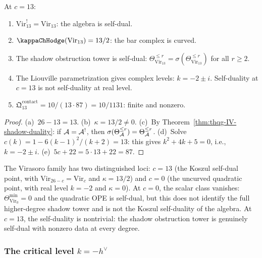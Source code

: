 \begin{proposition}[The $c = 13$ self-dual point; \ClaimStatusProvedHere]
At $c = 13$:
\begin{enumerate}[label=\textup{(\alph*)}]
\item $\mathrm{Vir}_{13}^! = \mathrm{Vir}_{13}$: the algebra is
 self-dual.
\item $\kappaChHodge(\mathrm{Vir}_{13}) = 13/2$: the bar complex is curved.
\item The shadow obstruction tower is self-dual:
 $\Theta_{\mathrm{Vir}_{13}}^{\leq r} = \sigma(\Theta_{\mathrm{Vir}_{13}}^{\leq r})$
 for all $r \geq 2$.
\item The Liouville parametrization gives complex levels:
 $k = -2 \pm i$. Self-duality at $c = 13$ is not
 self-duality at real level.
\item $\mathfrak{Q}^{\mathrm{contact}}_{13} = 10/(13 \cdot 87)
 = 10/1131$: finite and nonzero.
\end{enumerate}
\end{proposition}

\begin{proof}
(a)~$26 - 13 = 13$.
(b)~$\kappa = 13/2 \neq 0$.
(c)~By Theorem~\ref{thm:thqg-IV-shadow-duality}: if $\mathcal{A} = \mathcal{A}^!$,
then $\sigma(\Theta_{\mathcal{A}}^{\leq r}) = \Theta_{\mathcal{A}}^{\leq r}$.
(d)~Solve $c(k) = 1 - 6(k-1)^2/(k+2) = 13$: this gives
$k^2 + 4k + 5 = 0$, i.e., $k = -2 \pm i$.
(e)~$5c + 22 = 5 \cdot 13 + 22 = 87$.
\end{proof}

\begin{remark}[Koszul self-duality at $c = 13$ vs.\ the uncurved quadratic locus at $c = 0$]
The Virasoro family has two distinguished loci:
$c = 13$ (the Koszul self-dual point, with
$\mathrm{Vir}_{26-c} = \mathrm{Vir}_c$ and $\kappa = 13/2$) and
$c = 0$ (the uncurved quadratic point, with real level $k = -2$
and $\kappa = 0$). At $c = 0$, the scalar class vanishes:
$\Theta_{\mathrm{Vir}_0}^{\min} = 0$ and the quadratic OPE is
self-dual, but this does not identify the full higher-degree shadow
tower and is not the Koszul self-duality of the algebra.
At $c = 13$, the self-duality is nontrivial: the shadow obstruction tower is
genuinely self-dual with nonzero data at every degree.
\end{remark}

\subsubsection{The critical level \texorpdfstring{$k = -h^\vee$}{k = -h check}}

